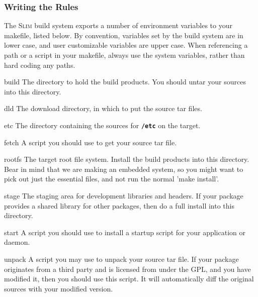 \documentclass[a4paper,10pt]{article}
\newenvironment{Description}[1][\quad]{%
  \begin{list}{}{%
      \renewcommand{\makelabel}[1]{\textbf{##1}\hfill}%
      \settowidth{\labelwidth}{\textbf{#1}}%
      \setlength{\leftmargin}{\labelwidth+\labelsep}%
  }%
}{%
  \end{list}%
}
\newcommand{\slim}{\textsc{Slim}\xspace}
\newcommand{\fw}{\tt\bf}
\begin{document}
\subsubsection{Writing the Rules}

    The \slim build system exports a number of environment variables
    to your makefile, listed below. By convention, variables set by
    the build system are in lower case, and user customizable
    variables are upper case. When referencing a path or a script in
    your makefile, always use the system variables, rather than hard
    coding any paths.

    \begin{Description}[HOSTCCX]
    \item[build]
      The directory to hold the build products.  You should untar your
      sources into this directory.


    \item[dld]
      The download directory, in which to put the source tar files.

    \item[etc]
      The directory containing the sources for {\fw /etc} on the
      target.

    \item[fetch]
      A script you should use to get your source tar file.


    \item[rootfs]
      The target root file system. Install the build products into
      this directory. Bear in mind that we are making an embedded
      system, so you might want to pick out just the essential files,
      and not run the normal 'make install'.

    \item[stage]
      The staging area for development libraries and headers. If your
      package provides a shared library for other packages, then do a
      full install into this directory.


    \item[start]
      A script you should use to install a startup script for your
      application or daemon.

    \item[unpack]
      A script you may use to unpack your source tar file. If your
      package originates from a third party and is licensed from under
      the GPL, and you have modified it, then you should use this
      script. It will automatically diff the original sources with
      your modified version.


\end{Description}
\end{document}
